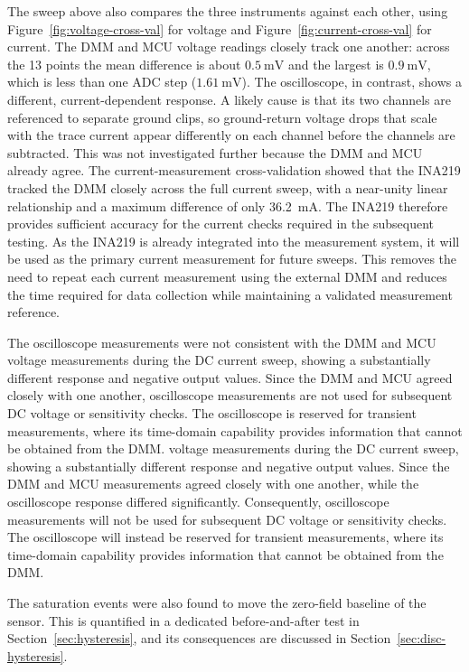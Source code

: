 \documentclass[12pt,a4paper]{article}
\begin{document}
The sweep above also compares the three instruments against each other, using Figure~\ref{fig:voltage-cross-val} for voltage and Figure~\ref{fig:current-cross-val} for current. The DMM and MCU voltage readings closely track one another: across the 13 points the mean difference is about $\SI{0.5}{\milli\volt}$ and the largest is $\SI{0.9}{\milli\volt}$, which is less than one ADC step ($\SI{1.61}{\milli\volt}$). The oscilloscope, in contrast, shows a different, current-dependent response. A likely cause is that its two channels are referenced to separate ground clips, so ground-return voltage drops that scale with the trace current appear differently on each channel before the channels are subtracted. This was not investigated further because the DMM and MCU already agree.
The current-measurement cross-validation showed that the INA219 tracked
the DMM closely across the full current sweep, with a near-unity linear
relationship and a maximum difference of only \SI{36.2}{\milli\ampere}.
The INA219 therefore provides sufficient accuracy for the current checks
required in the subsequent testing. As the INA219 is already integrated
into the measurement system, it will be used as the primary current
measurement for future sweeps. This removes the need to repeat each
current measurement using the external DMM and reduces the time required
for data collection while maintaining a validated measurement reference.

The oscilloscope measurements were not consistent with the DMM and MCU voltage measurements during the DC current sweep, showing a substantially different response and negative output values. Since the DMM and MCU agreed closely with one another, oscilloscope measurements are not used for subsequent DC voltage or sensitivity checks. The oscilloscope is reserved for transient measurements, where its time-domain capability provides information that cannot be obtained from the DMM.
voltage measurements during the DC  current sweep, showing a substantially
different response and negative output values. Since the DMM and MCU
measurements agreed closely with one another, while the oscilloscope
response differed significantly. Consequently, oscilloscope measurements will not be used for
subsequent DC voltage or sensitivity checks. The oscilloscope will instead
be reserved for transient measurements, where its time-domain capability
provides information that cannot be obtained from the DMM.


The saturation events were also found to move the zero-field baseline of the sensor. This is quantified in a dedicated before-and-after test in Section~\ref{sec:hysteresis}, and its consequences are discussed in Section~\ref{sec:disc-hysteresis}.
\end{document}
